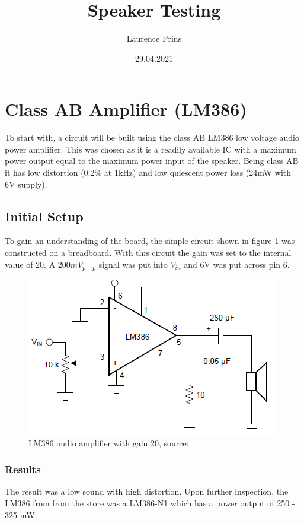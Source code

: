 \documentclass[12pt, a4paper]{article}
\title{Speaker Testing}
\author{Laurence Prins}
\date{29.04.2021}
\begin{document}
\maketitle
\section{Class AB Amplifier (LM386)}
To start with, a circuit will be built using the class AB LM386 low voltage audio power amplifier. This was chosen as it is a readily available IC with a maximum power output equal to the maximum power input of the speaker. Being class AB it has low distortion (0.2\% at 1kHz) and low quiescent power loss (24mW with 6V supply).
\subsection{Initial Setup}
To gain an understanding of the board, the simple circuit shown in figure \ref{fig:LM386_gain_20} was constructed on a breadboard. With this circuit the gain was set to the internal value of 20. A 200$mV_{p-p}$ signal was put into $V_{in}$ and 6V was put across pin 6. 
\begin{figure} [!htb]
	\hfill\includegraphics{./Figures/LM386_Gain_20}\hspace*{\fill}	
	\caption{LM386 audio amplifier with gain 20, source: \cite{lm386datasheet}}
	\label{fig:LM386_gain_20}
\end{figure}
\subsubsection{Results}
The result was a low sound with high distortion. Upon further inspection, the LM386 from from the store was a LM386-N1 which has a power output of 250 - 325 mW. 
\pagebreak
\end{document}
